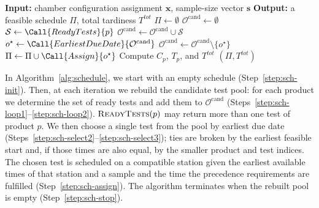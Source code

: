 \begin{algorithm}[H]
\caption{\textsc{Schedule}()}
\label{alg:schedule}
\label{alg:scheduling}
\label{alg:scheduling_procedure}
\label{alg:scheduler_short}
\begin{algorithmic}[1]
\State \textbf{Input:} chamber configuration assignment \(\mathbf{x}\), sample-size vector \(\mathbf{s}\)
\State \textbf{Output:} a feasible schedule \(\Pi\), total tardiness \(T^{tot}\)
\State \(\Pi\leftarrow\emptyset\) \label{step:sch-init}
\Repeat \label{step:sch-loop}
    \State \(\mathcal{O}^{\mathrm{cand}}\leftarrow\emptyset\) \label{step:sch-pool}
     \label{step:sch-loop1}
        \State \(\mathcal{S}\leftarrow\Call{ReadyTests}{p}\) \label{step:sch-ready}
        \State \(\mathcal{O}^{\mathrm{cand}}\leftarrow\mathcal{O}^{\mathrm{cand}}\cup\mathcal{S}\)
    \EndFor \label{step:sch-loop2}
     \label{step:sch-select}
        \State \(o^{\star}\leftarrow\Call{EarliestDueDate}{\mathcal{O}^{\mathrm{cand}}}\) \label{step:sch-select2}
        \State \(\mathcal{O}^{\mathrm{cand}}\leftarrow\mathcal{O}^{\mathrm{cand}}\setminus\{o^{\star}\}\) \label{step:sch-select3}
        \State \(\Pi\leftarrow\Pi\cup\Call{Assign}{o^{\star}}\) \label{step:sch-assign}
    \EndIf
{} \label{step:sch-stop}
\State Compute \(C_p\), \(T_p\), and \(T^{tot}\) \label{step:sch-obj}
\State \Return \((\Pi,T^{tot})\)
\end{algorithmic}
\end{algorithm}

In Algorithm~\ref{alg:schedule}, we start with an empty schedule (Step~\ref{step:sch-init}). Then, at each iteration we rebuild the candidate test pool: for each product we determine the set of ready tests and add them to \(\mathcal{O}^{\mathrm{cand}}\) (Steps~\ref{step:sch-loop1}--\ref{step:sch-loop2}). \(\textsc{ReadyTests}(p)\) may return more than one test of product \(p\). We then choose a single test from the pool by earliest due date (Steps~\ref{step:sch-select2}--\ref{step:sch-select3}); ties are broken by the earliest feasible start and, if those times are also equal, by the smaller product and test indices. The chosen test is scheduled on a compatible station given the earliest available times of that station and a sample and the time the precedence requirements are fulfilled (Step~\ref{step:sch-assign}). The algorithm terminates when the rebuilt pool is empty (Step~\ref{step:sch-stop}).
